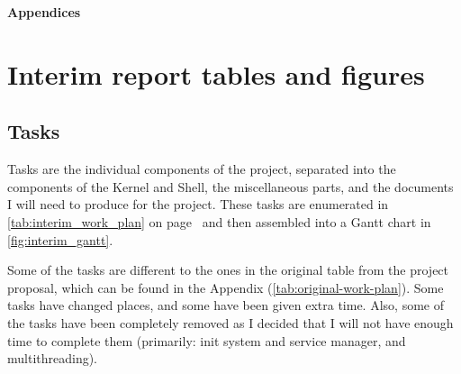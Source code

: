 \documentclass{article}
\begin{document}
\clearpage


\printglossaries

\nocite{osdev-wiki}
\nocite{unix-prog-env}
\printbibliography[heading=bibintoc]


































\clearpage
\appendix
{}
\newrefsection
{}
\renewcommand{\thesubsection}{\Alph{subsection}}
\renewcommand{\thesubsubsection}{\thesubsection.\alph{subsubsection}}

{\Large\bfseries Appendices\vspace{2ex}}

\section{Interim report tables and figures}

\subsection{Tasks}
Tasks are the individual components of the project, separated into the
components of the Kernel and Shell, the miscellaneous parts, and the documents
I will need to produce for the project. These tasks are enumerated in
\autoref{tab:interim_work_plan} on page~\pageref*{tab:work-plan} and then assembled into
a Gantt chart in \autoref{fig:interim_gantt}.

Some of the tasks are different to the ones in the original table from the
project proposal, which can be found in the Appendix
(\autoref{tab:original-work-plan}). Some tasks have changed places, and some
have been given extra time. Also, some of the tasks have been completely
removed as I decided that I will not have enough time to complete them
(primarily: init system and service manager, and multithreading).
\end{document}
